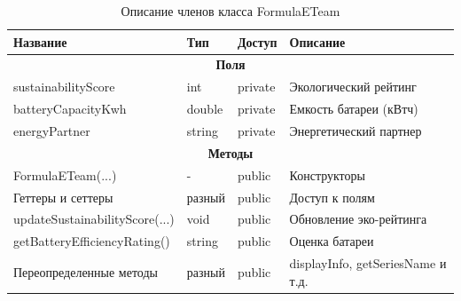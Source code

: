 \begin{table}[htbp]
\centering
\caption{Описание членов класса FormulaETeam}
\begin{tabular}{|p{5.5cm}|p{3cm}|p{2cm}|p{5cm}|}
\hline
\textbf{Название} & \textbf{Тип} & \textbf{Доступ} & \textbf{Описание} \\ \hline
\multicolumn{4}{|c|}{\textbf{Поля}} \\ \hline
sustainabilityScore & int & private & Экологический рейтинг \\ \hline
batteryCapacityKwh & double & private & Емкость батареи (кВтч) \\ \hline
energyPartner & string & private & Энергетический партнер \\ \hline
\multicolumn{4}{|c|}{\textbf{Методы}} \\ \hline
FormulaETeam(...) & - & public & Конструкторы \\ \hline
Геттеры и сеттеры & разный & public & Доступ к полям \\ \hline
updateSustainabilityScore(...) & void & public & Обновление эко-рейтинга \\ \hline
getBatteryEfficiencyRating() & string & public & Оценка батареи \\ \hline
Переопределенные методы & разный & public & displayInfo, getSeriesName и т.д. \\ \hline
\end{tabular}
\end{table}
